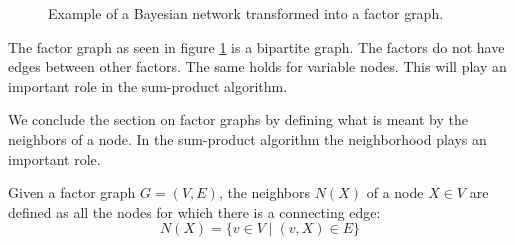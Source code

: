\begin{exmp}
\begin{figure}[h!]
\begin{minipage}{0.4\textwidth}
\begin{tikzpicture}
	
\end{tikzpicture}
\end{minipage}
\begin{minipage}{0.4\textwidth}
\end{minipage}
\caption{Example of a Bayesian network transformed into a
factor graph.}
\label{fig:BN_to_factor}
\end{figure}

\noindent
The factor graph as seen in figure \ref{fig:BN_to_factor} is a bipartite
graph. The factors do not have edges between other factors. The same holds
for variable nodes. This will play an important role in the sum-product
algorithm.
\end{exmp}

\noindent
We conclude the section on factor graphs by defining what is
meant by the neighbors of a node. In the sum-product algorithm
the neighborhood plays an important role.
\begin{defn}
Given a factor graph $G = (V, E)$, the neighbors $N(X)$ of a node 
$X \in V$ are defined as all the nodes for which there is a 
connecting edge:
\begin{equation}
N(X) = \{v \in V \mid (v, X) \in E\}
\end{equation}
\end{defn}


